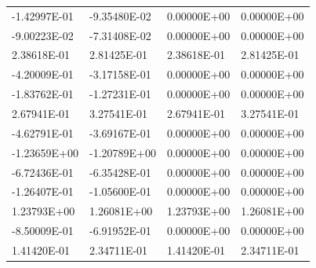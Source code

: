 \begin{longtable}{llll}
    -1.42997E-01                       & -9.35480E-02                       & 0.00000E+00                                                 & 0.00000E+00          \\
    -9.00223E-02                       & -7.31408E-02                       & 0.00000E+00                                                 & 0.00000E+00          \\
    2.38618E-01                        & 2.81425E-01                        & 2.38618E-01                                                 & 2.81425E-01          \\
    -4.20009E-01                       & -3.17158E-01                       & 0.00000E+00                                                 & 0.00000E+00          \\
    -1.83762E-01                       & -1.27231E-01                       & 0.00000E+00                                                 & 0.00000E+00          \\
    2.67941E-01                        & 3.27541E-01                        & 2.67941E-01                                                 & 3.27541E-01          \\
    -4.62791E-01                       & -3.69167E-01                       & 0.00000E+00                                                 & 0.00000E+00          \\
    -1.23659E+00                       & -1.20789E+00                       & 0.00000E+00                                                 & 0.00000E+00          \\
    -6.72436E-01                       & -6.35428E-01                       & 0.00000E+00                                                 & 0.00000E+00          \\
    -1.26407E-01                       & -1.05600E-01                       & 0.00000E+00                                                 & 0.00000E+00          \\
    1.23793E+00                        & 1.26081E+00                        & 1.23793E+00                                                 & 1.26081E+00          \\
    -8.50009E-01                       & -6.91952E-01                       & 0.00000E+00                                                 & 0.00000E+00          \\
    1.41420E-01                        & 2.34711E-01                        & 1.41420E-01                                                 & 2.34711E-01          \\

\end{longtable}
